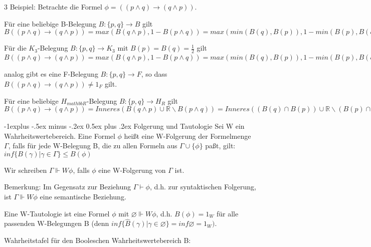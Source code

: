 \documentclass[a4paper]{article}
\makeatletter
\renewcommand{\subsection}{\@startsection{subsection}{2}{0mm}%
                {-1explus -.5ex minus -.2ex}%
                {0.5ex plus .2ex}%
                {\normalfont\normalsize\bfseries}}
\makeatother
\begin{document}
\begin{multicols}{3}
  Beispiel: Betrachte die Formel $\phi= ((p\wedge q)\rightarrow (q\wedge p))$.
  \begin{itemize*}
    \item Für eine beliebige B-Belegung $B:\{p,q\}\rightarrow B$ gilt $B((p\wedge q)\rightarrow (q\wedge p)) = max(B(q\wedge p), 1 -B(p\wedge q)) = max(min(B(q),B(p)), 1 -min(B(p),B(q))) = 1 = 1_B$
    \item Für die $K_3$-Belegung $B:\{p,q\}\rightarrow K_3$ mit $B(p) =B(q) = \frac{1}{2}$ gilt $B((p\wedge q)\rightarrow (q\wedge p)) = max(B(q\wedge p), 1 -B(p\wedge q))= max(min(B(q),B(p)), 1 -min(B(p),B(q))) = \frac{1}{2} \not= 1_{K_3}$
    \item analog gibt es eine F-Belegung $B:\{p,q\}\rightarrow F$, so dass $B((p\wedge q)\rightarrow (q\wedge p)) \not = 1_F$ gilt.
    \item Für eine beliebige $H_{mathbb{R}}$-Belegung $B:\{p,q\}\rightarrow H_R$ gilt $B((p\wedge q)\rightarrow (q\wedge p)) = Inneres(B(q\wedge p)\cup \mathbb{R}\backslash B(p\wedge q)) = Inneres((B(q)\cap B(p))\cup \mathbb{R}\backslash (B(p)\cap B(q))) = Inneres(\mathbb{R}) = \mathbb{R} = 1_{H_R}$
  \end{itemize*}

  \subsection{Folgerung und Tautologie}
  Sei W ein Wahrheitswertebereich.
  Eine Formel $\phi$ heißt eine W-Folgerung der Formelmenge $\Gamma$, falls für jede W-Belegung B, die zu allen Formeln aus $\Gamma \cup\{\phi\}$ paßt, gilt:
  $inf\{B(\gamma )|\gamma \in \Gamma \}\leq B(\phi)$

  Wir schreiben $\Gamma \Vdash W\phi$, falls $\phi$ eine W-Folgerung von $\Gamma$ ist.

  Bemerkung: Im Gegensatz zur Beziehung $\Gamma \vdash \phi$, d.h. zur syntaktischen Folgerung, ist $\Gamma \Vdash W \phi$ eine semantische Beziehung.

  Eine W-Tautologie ist eine Formel $\phi$ mit $\varnothing \Vdash W\phi$, d.h. $B(\phi) = 1_W$ für alle passenden W-Belegungen B (denn $inf\{\hat{B}(\gamma )|\gamma \in \varnothing \}= inf \varnothing = 1_W)$.

  Wahrheitstafel für den Booleschen Wahrheitswertebereich B:


\end{multicols}
\end{document}
